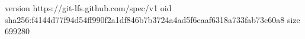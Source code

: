 version https://git-lfs.github.com/spec/v1
oid sha256:f4144d77f94d54ff990f2a1df846b7b3724a4ad5f6eaaf6318a733fab73c60a8
size 699280
